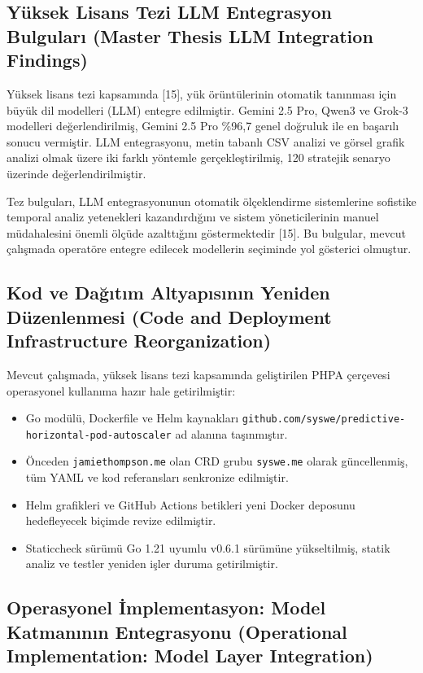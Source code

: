 \documentclass[12pt,a4paper]{article}
\begin{document}
\subsection{Yüksek Lisans Tezi LLM Entegrasyon Bulguları (Master Thesis LLM Integration Findings)}

Yüksek lisans tezi kapsamında [15], yük örüntülerinin otomatik tanınması için büyük dil modelleri (LLM) entegre edilmiştir. Gemini 2.5 Pro, Qwen3 ve Grok-3 modelleri değerlendirilmiş, Gemini 2.5 Pro \%96,7 genel doğruluk ile en başarılı sonucu vermiştir. LLM entegrasyonu, metin tabanlı CSV analizi ve görsel grafik analizi olmak üzere iki farklı yöntemle gerçekleştirilmiş, 120 stratejik senaryo üzerinde değerlendirilmiştir.

Tez bulguları, LLM entegrasyonunun otomatik ölçeklendirme sistemlerine sofistike temporal analiz yetenekleri kazandırdığını ve sistem yöneticilerinin manuel müdahalesini önemli ölçüde azalttığını göstermektedir [15]. Bu bulgular, mevcut çalışmada operatöre entegre edilecek modellerin seçiminde yol gösterici olmuştur.

\subsection{Kod ve Dağıtım Altyapısının Yeniden Düzenlenmesi (Code and Deployment Infrastructure Reorganization)}

Mevcut çalışmada, yüksek lisans tezi kapsamında geliştirilen PHPA çerçevesi operasyonel kullanıma hazır hale getirilmiştir:

\begin{itemize}[noitemsep]
  \item Go modülü, Dockerfile ve Helm kaynakları \texttt{github.com/syswe/predictive-horizontal-pod-autoscaler} ad alanına taşınmıştır.
  \item Önceden \texttt{jamiethompson.me} olan CRD grubu \texttt{syswe.me} olarak güncellenmiş, tüm YAML ve kod referansları senkronize edilmiştir.
  \item Helm grafikleri ve GitHub Actions betikleri yeni Docker deposunu hedefleyecek biçimde revize edilmiştir.
  \item Staticcheck sürümü Go 1.21 uyumlu v0.6.1 sürümüne yükseltilmiş, statik analiz ve testler yeniden işler duruma getirilmiştir.
\end{itemize}

\subsection{Operasyonel İmplementasyon: Model Katmanının Entegrasyonu (Operational Implementation: Model Layer Integration)}
\end{document}

